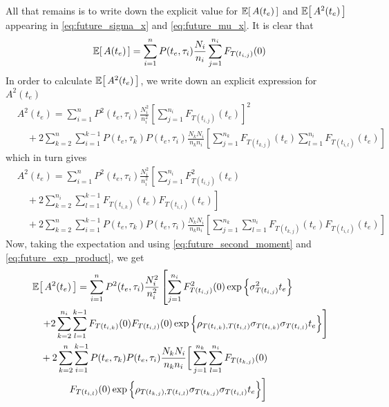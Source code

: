 All that remains is to write down the explicit value for $\Ex{A(t_e)}$ and $\Ex{A^2(t_e)}$ appearing in \eqref{eq:future_sigma_x} and \eqref{eq:future_mu_x}. It is clear that
\begin{equation}
\label{eq:exp_A_te}
\Ex{A(t_e)} = \sum_{i=1}^{n} P(t_e, \tau_i) \frac{N_i}{n_i} \sum_{j=1}^{n_i} F_{T(t_{i,j})}(0)
\end{equation}
In order to calculate $\Ex{A^2(t_e)}$, we write down an explicit expression for $A^2(t_e)$
\begin{equation}
\begin{split}
& A^2(t_e) = \sum_{i=1}^{n} P^2(t_e, \tau_i) \frac{N^2_i}{n^2_i} \left[ \sum_{j=1}^{n_i} F_{T(t_{i,j})}(t_e) \right]^2 \\
         &\quad + 2 \sum_{k=2}^{n} \sum_{i=1}^{k-1} P(t_e, \tau_k) P(t_e, \tau_i) \frac{N_k N_i}{n_k n_i} \left[ \sum_{j=1}^{n_k} F_{T(t_{k,j})}(t_e) \sum_{l=1}^{n_i} F_{T(t_{i,l})}(t_e) \right]
\end{split}
\end{equation}
which in turn gives
\begin{equation}
\label{eq:future_A_te_2}
\begin{split}
& A^2(t_e) = \sum_{i=1}^{n} P^2(t_e, \tau_i) \frac{N^2_i}{n^2_i} \left[ \sum_{j=1}^{n_i} F^2_{T(t_{i,j})}(t_e) \right. \\
         &\quad + \left. 2 \sum_{k=2}^{n_i} \sum_{l=1}^{k-1} F_{T(t_{i,k})}(t_e) F_{T(t_{i,l})}(t_e) \right] \\
         &\quad + 2 \sum_{k=2}^{n} \sum_{i=1}^{k-1} P(t_e, \tau_k) P(t_e, \tau_i) \frac{N_k N_i}{n_k n_i} \left[ \sum_{j=1}^{n_k} \sum_{l=1}^{n_i} F_{T(t_{k,j})}(t_e) F_{T(t_{i,l})}(t_e) \right]
\end{split}
\end{equation}
Now, taking the expectation and using \eqref{eq:future_second_moment} and \eqref{eq:future_exp_product}, we get
\begin{equation}
\label{eq:exp_future_A_te_2}
\begin{split}
& \Ex{A^2(t_e)} = \sum_{i=1}^{n} P^2(t_e, \tau_i) \frac{N^2_i}{n^2_i} \left[ \sum_{j=1}^{n_i} F^2_{T(t_{i,j})}(0) \exp \left\{ \sigma^2_{T(t_{i,j})} t_e \right\} \right. \\
              &\quad \left. + 2 \sum_{k=2}^{n_i} \sum_{l=1}^{k-1} F_{T(t_{i,k})}(0) F_{T(t_{i,l})}(0) \exp \Big\{ \rho_{T(t_{i,k}), T(t_{i,l})} \sigma_{T(t_{i,k})} \sigma_{T(t_{i,l})} t_e \Big\} \right] \\
              &\quad + 2 \sum_{k=2}^{n} \sum_{i=1}^{k-1} P(t_e, \tau_k) P(t_e, \tau_i) \frac{N_k N_i}{n_k n_i} \bigg[ \sum_{j=1}^{n_k} \sum_{l=1}^{n_i} F_{T(t_{k,j})}(0) \bigg. \\
              &\qquad \qquad \bigg. F_{T(t_{i,l})}(0) \exp \Big\{ \rho_{T(t_{k,j}), T(t_{i,l})} \sigma_{T(t_{k,j})} \sigma_{T(t_{i,l})} t_e \Big\} \bigg]
\end{split}
\end{equation}


